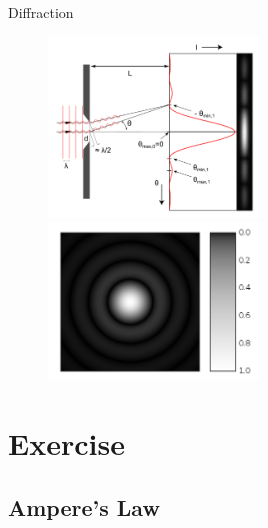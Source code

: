 \documentclass{beamer}
\begin{document}
\begin{frame}{Diffraction}
    \begin{figure}[htbp]
        \centering
        \includegraphics[width=0.5\textwidth]{images/df_ref.png}%
        \includegraphics[width=0.5\textwidth]{images/df_ref_2.png}
    \end{figure} %
    
\end{frame}



\section{Exercise}

\subsection{Ampere's Law}
\end{document}
